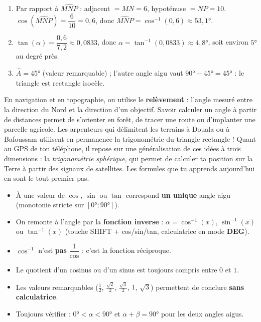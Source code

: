 \documentclass[11pt]{article}
\begin{document}
\begin{corrige}
\begin{enumerate}
  \item Par rapport à $\widehat{MNP}$ : adjacent $= MN = 6$, hypoténuse $= NP = 10$. $\cos(\widehat{MNP}) = \dfrac{6}{10} = 0,6$, donc $\widehat{MNP} = \cos^{-1}(0,6) \approx 53,1°$.
  \item $\tan(\alpha) = \dfrac{0,6}{7,2} \approx 0,0833$, donc $\alpha = \tan^{-1}(0,0833) \approx 4,8°$, soit environ $5°$ au degré près.
  \item $\widehat{A} = 45°$ (valeur remarquable) ; l'autre angle aigu vaut $90° - 45° = 45°$ : le triangle est rectangle isocèle.
\end{enumerate}
\end{corrige}

\begin{savaistu}
En navigation et en topographie, on utilise le \textbf{relèvement} : l'angle mesuré entre la direction du Nord et la direction d'un objectif. Savoir calculer un angle à partir de distances permet de s'orienter en forêt, de tracer une route ou d'implanter une parcelle agricole. Les arpenteurs qui délimitent les terrains à Douala ou à Bafoussam utilisent en permanence la trigonométrie du triangle rectangle ! Quant au GPS de ton téléphone, il repose sur une généralisation de ces idées à trois dimensions : la \emph{trigonométrie sphérique}, qui permet de calculer ta position sur la Terre à partir des signaux de satellites. Les formules que tu apprends aujourd'hui en sont le tout premier pas.
\end{savaistu}

\begin{aretenir}
\begin{itemize}
  \item À une valeur de $\cos$, $\sin$ ou $\tan$ correspond \textbf{un unique} angle aigu (monotonie stricte sur $[0°;90°]$).
  \item On remonte à l'angle par la \textbf{fonction inverse} : $\alpha = \cos^{-1}(x)$, $\sin^{-1}(x)$ ou $\tan^{-1}(x)$ (touche SHIFT + cos/sin/tan, calculatrice en mode \textbf{DEG}).
  \item $\cos^{-1}$ n'est \textbf{pas} $\dfrac{1}{\cos}$ : c'est la fonction réciproque.
  \item Le quotient d'un cosinus ou d'un sinus est toujours compris entre $0$ et $1$.
  \item Les valeurs remarquables ($\tfrac12$, $\tfrac{\sqrt2}{2}$, $\tfrac{\sqrt3}{2}$, $1$, $\sqrt 3$) permettent de conclure \textbf{sans calculatrice}.
  \item Toujours vérifier : $0° < \alpha < 90°$ et $\alpha + \beta = 90°$ pour les deux angles aigus.
\end{itemize}
\end{aretenir}
\end{document}
